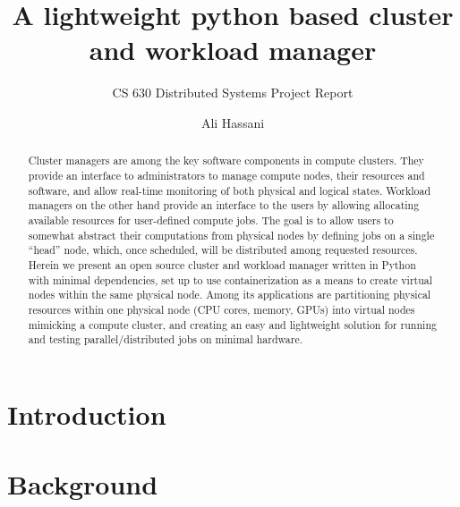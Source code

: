 \documentclass[sigconf]{acmart}
\begin{document}
\title{A lightweight python based cluster and workload manager}

\subtitle{CS 630 Distributed Systems Project Report}

\author{Ali Hassani}

\renewcommand{\shortauthors}{Hassani}

\begin{abstract}
    Cluster managers are among the key software components in compute clusters.
    They provide an interface to administrators to manage compute nodes, their resources and software, and allow real-time
    monitoring of both physical and logical states. Workload managers on the other hand provide an interface to the users by
    allowing allocating available resources for user-defined compute jobs.
    The goal is to allow users to somewhat abstract their computations from physical nodes by defining jobs on a single ``head''
    node, which, once scheduled, will be distributed among requested resources.
    Herein we present an open source cluster and workload manager written in Python with minimal dependencies, set up to use
    containerization as a means to create virtual nodes within the same physical node.
    Among its applications are partitioning physical resources within one physical node (CPU cores, memory, GPUs) into virtual
    nodes mimicking a compute cluster, and creating an easy and lightweight solution for running and testing 
    parallel/distributed jobs on minimal hardware.
\end{abstract}

\maketitle

\section{Introduction}

\section{Background}
\end{document}
